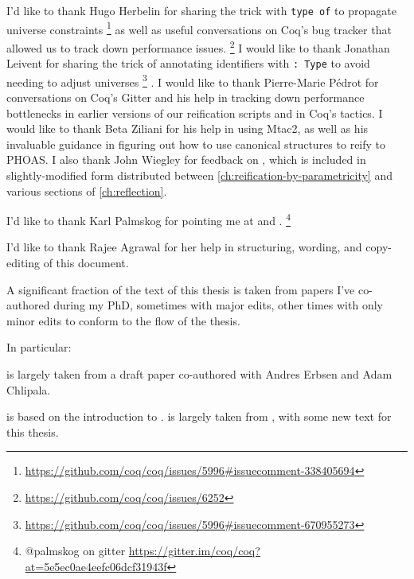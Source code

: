 I'd like to thank Hugo Herbelin for sharing the trick with \texttt{type of} to propagate universe constraints%
\footnote{%
    \url{https://github.com/coq/coq/issues/5996\#issuecomment-338405694}%
}
as well as useful conversations on Coq's bug tracker that allowed us to track down performance issues.%
\footnote{%
    \url{https://github.com/coq/coq/issues/6252}%
}
I would like to thank Jonathan Leivent for sharing the trick of annotating identifiers with \texttt{: Type} to avoid needing to adjust universes%
\footnote{%
  \url{https://github.com/coq/coq/issues/5996\#issuecomment-670955273}
}%
.
I would like to thank Pierre-Marie Pédrot for conversations on Coq's Gitter and his help in tracking down performance bottlenecks in earlier versions of our reification scripts and in Coq's tactics.
I would like to thank Beta Ziliani for his help in using Mtac2, as well as his invaluable guidance in figuring out how to use canonical structures to reify to PHOAS.
I also thank John Wiegley for feedback on , which is included in slightly-modified form distributed between \autoref{ch:reification-by-parametricity} and various sections of \autoref{ch:reflection}.

I'd like to thank Karl Palmskog for pointing me at \textcite{Should1999Lamport} and \textcite{Formalising2018Paulson}.%
\footnote{@palmskog on gitter \url{https://gitter.im/coq/coq?at=5e5ec0ae4eefc06dcf31943f}}


I'd like to thank Rajee Agrawal for her help in structuring, wording, and copy-editing of this document.

A significant fraction of the text of this thesis is taken from papers I've co-authored during my PhD, sometimes with major edits, other times with only minor edits to conform to the flow of the thesis.

In particular:

 is largely taken from a draft paper co-authored with Andres Erbsen and Adam Chlipala.

 is based on the introduction to .
 is largely taken from , with some new text for this thesis.

